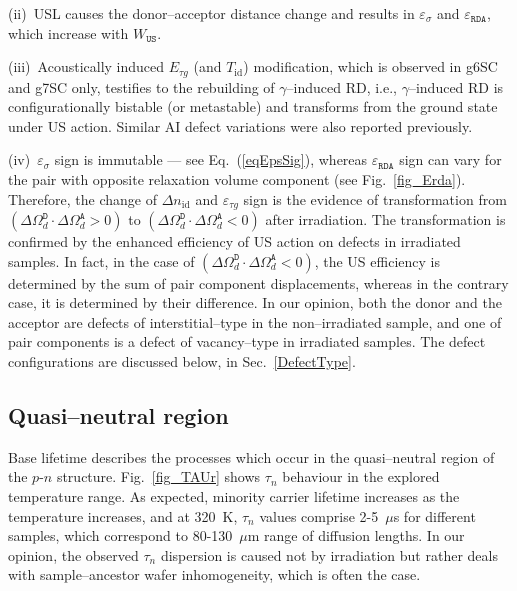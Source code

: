 \documentclass[aip,jap, amsmath,amssymb,reprint]{revtex4-1}
\begin{document}
\noindent
(ii)~USL causes the donor--acceptor distance change and results in $\varepsilon_{\sigma}$ and $\varepsilon_{\mathtt{RDA}}$,
which increase with $W_{\mathtt{US}}$.

\noindent
(iii)~Acoustically induced $E_{\tau g}$ (and $T_{\mathrm{id}}$) modification, which is observed in g6SC and g7SC only,
testifies to the rebuilding of  $\gamma$--induced RD,
i.e., $\gamma$--induced RD is conﬁgurationally bistable (or metastable) and transforms from the ground state under US action.
Similar AI defect variations were also reported previously.\cite{Wosinski,Ostapenko1994,Olikh2009Sem,YOlikhTPL2011}

\noindent
(iv)~$\varepsilon_{\sigma}$ sign is immutable --- see Eq.~(\ref{eqEpsSig}),
whereas $\varepsilon_{\mathtt{RDA}}$ sign can vary for the pair with opposite relaxation volume component (see Fig.~\ref{fig_Erda}).
Therefore, the change of $\Delta n_{\mathrm{id}}$ and $\varepsilon_{\tau g}$ sign is the evidence of transformation
from $(\Delta\Omega_d^\mathtt{D}\cdot\Delta\Omega_d^\mathtt{A}>0)$  to
$(\Delta\Omega_d^\mathtt{D}\cdot\Delta\Omega_d^\mathtt{A}<0)$  after irradiation.
The transformation is confirmed by the enhanced efficiency of US action on defects in irradiated samples.
In fact, in the case of $(\Delta\Omega_d^\mathtt{D}\cdot\Delta\Omega_d^\mathtt{A}<0)$, the US efficiency is determined by the sum of pair component displacements,
whereas in the contrary case, it is determined by their difference.
In our opinion, both the donor and the acceptor are defects of interstitial--type in the non--irradiated sample, and one of pair components is a defect of vacancy--type in irradiated samples.
The defect configurations are discussed below, in Sec.~\ref{DefectType}.


\subsection{Quasi--neutral region\label{Base}}

Base lifetime describes the processes which occur in the quasi--neutral region  of the $p$-$n$ structure.
Fig.~\ref{fig_TAUr} shows  $\tau_n$  behaviour in the explored temperature range.
As expected, minority carrier lifetime increases as the temperature increases, and at 320~K,
$\tau_n$ values comprise  2-5~$\mu$s for different samples, which
correspond to 80-130~$\mu$m range of diffusion lengths.
In our opinion, the observed $\tau_n$ dispersion is caused not by irradiation but rather deals with sample--ancestor wafer inhomogeneity, which is often the case.\cite{Oxide:Chen,Oxide_Schon}
\end{document}
